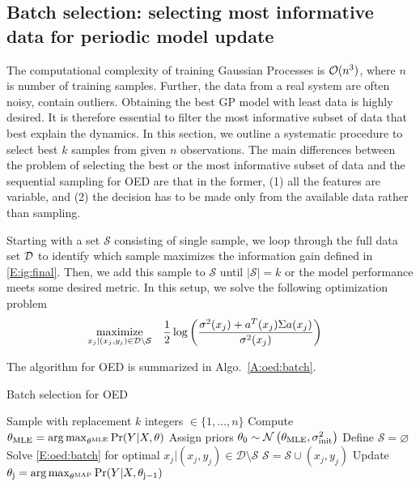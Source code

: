 \begin{figure}[!tb]
	\centering
	\caption{}
	\captionsetup{justification=centering}
	\label{F:OED}
\end{figure}


\subsection{Batch selection: selecting most informative data for periodic model update}

The computational complexity of training Gaussian Processes is $\mathcal{O}(n^3)$, where $n$ is number of training samples. 
Further, the data from a real system are often noisy, contain outliers. 
Obtaining the best GP model with least data is highly desired.
It is therefore essential to filter the most informative subset of data that best explain the dynamics.
In this section, we outline a systematic procedure to select best $k$ samples from given $n$ observations.
The main differences between the problem of selecting the best or the most informative subset of data and the sequential sampling for OED are that in the former, (1) all the features are variable, and (2) the decision has to be made only from the available data rather than sampling. 

Starting with a set \(\mathcal{S}\) consisting of single sample, we loop through the full data set \(\mathcal{D}\) to identify which sample maximizes the information gain defined in \eqref{E:ig:final}. Then, we add this sample to \(\mathcal{S}\) until \(|\mathcal{S}|=k\) or the model performance meets some desired metric. In this setup, we solve the following optimization problem
\begin{align}
\label{E:oed:batch}
\maximize_{x_{j}|(x_j,y_j) \in \mathcal{D} \setminus \mathcal{S}} & \ \ \ \frac{1}{2}\log\left(\frac{\sigma^2(x_j)+a^T(x_j)\Sigma a(x_j)}{\sigma^2(x_j)}\right)
\end{align}

The algorithm for OED is summarized in Algo.~\ref{A:oed:batch}.

\begin{algorithm}[!tb]
	\caption{Batch selection for OED}
	\label{A:oed:batch}
	\begin{algorithmic}[1]
		\State Sample with replacement \(k\) integers \( \in \{1,\dots,n\} \)
		\State Compute \( \theta_{\mathrm{MLE}} = \operatorname*{arg\,max}_{\theta^{\mathrm{MLE}}} \Pr(Y \vert X, \theta)\)
		\State Assign priors \(\theta_{\mathrm{0}} \sim \operatorname*{\mathcal{N}}\left(\theta_{\mathrm{MLE}}, \sigma^2_{\mathrm{init}}\right)\)
		\EndProcedure
		\State Define \(\mathcal{S} = \varnothing\)
		\State Solve \eqref{E:oed:batch} for optimal \({x_{j} \vert (x_j,y_j) \in \mathcal{D} \setminus \mathcal{S}} \)
		\State \(\mathcal{S} = \mathcal{S} \cup (x_j,y_j) \)
		\State Update \( \theta_{\mathrm{j}} = \operatorname*{arg\,max}_{\theta^{\mathrm{MAP}}} \Pr(Y \vert X, \theta_{\mathrm{j-1}})\)
		\EndWhile
		\EndProcedure
	\end{algorithmic}
\end{algorithm}

%	
